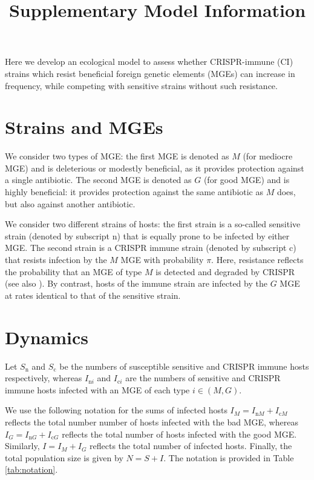 \documentclass{article}
\title{Supplementary Model Information}
\author{}
\date{\vspace{-2.5em}}
\newcommand{\badFGE}{M}
\newcommand{\goodFGE}{G}
\newcommand{\sensitive}{\mathrm{n}}
\newcommand{\immune}{\mathrm{c}}
\begin{document}
\maketitle

Here we develop an ecological model to assess whether CRISPR-immune (CI) strains
which resist beneficial foreign genetic elements (MGEs) can increase in
frequency, while competing with sensitive strains without such
resistance.

\section{Strains and MGEs}\label{sec:strains-and-fges}

We consider two types of MGE: the first MGE is denoted as $\badFGE$ (for mediocre MGE) and is deleterious or modestly beneficial, as it provides protection against a single
antibiotic. The second MGE is denoted as $\goodFGE$ (for good MGE) and is highly beneficial:
it provides protection against the same antibiotic as $\badFGE$ does, but
also against another antibiotic.

We consider two different strains of hosts: the first strain is a so-called 
sensitive strain (denoted by subscript $\sensitive$) that is equally prone to
be infected by either MGE. The second strain is a CRISPR immune strain 
(denoted by subscript $\immune$) that resists infection by the $\badFGE$ MGE with
probability $\pi$. Here, resistance reflects the probability
that an MGE of type $\badFGE$ is detected and degraded by CRISPR (see
also \citet{Gandon2013}). By contrast, hosts of the immune strain are 
infected by the $\goodFGE$ MGE at rates identical to that of 
the sensitive strain. 

\section{Dynamics\label{sec:dynamics}}
Let $S_{\sensitive}$ and $S_{\immune}$ be the numbers of susceptible
sensitive and CRISPR immune hosts respectively, whereas
$I_{\sensitive i}$ and $I_{\immune i}$ are the numbers of sensitive and 
CRISPR immune hosts infected with an MGE of each type  $i \in (\badFGE,\goodFGE)$. 

We use the following notation for the sums of infected hosts $I_{\badFGE} = I_{\sensitive\badFGE} + I_{\immune\badFGE}$ 
reflects the total number number of hosts infected with the bad MGE,
whereas $I_{\goodFGE} = I_{\sensitive\goodFGE} + I_{\immune\goodFGE}$ reflects the total number of hosts infected with the good MGE. Similarly, $I = I_{\badFGE} + I_{\goodFGE}$ reflects the total number of infected hosts. Finally, the total population size is given by $N=S+ I$. The notation is provided in Table \ref{tab:notation}.
\end{document}
